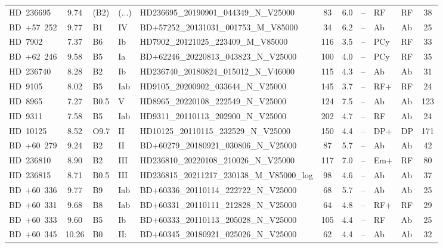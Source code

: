 {\begin{landscape}
\begin{longtable}{lclllcclllc}
\noalign{\smallskip}
HD~236695 & 9.74 & (B2) & (...) & HD236695\_20190901\_044349\_N\_V25000 & 83 & 6.0 & -- & RF & RF & 38 \\
\noalign{\smallskip}
BD~+57~252 & 9.77 & B1 & IV & BD+57252\_20131031\_001753\_M\_V85000 & 34 & 6.2 & -- & Ab & Ab & 25 \\
\noalign{\smallskip}
HD~7902 & 7.37 & B6 & Ib & HD7902\_20121025\_223409\_M\_V85000 & 116 & 3.5 & -- & PCy & RF & 33 \\
\noalign{\smallskip}
BD~+62~246 & 9.58 & B5 & Ia & BD+62246\_20220813\_043823\_N\_V25000 & 100 & 4.0 & -- & PCy & RF & 35 \\
\noalign{\smallskip}
HD~236740 & 8.28 & B2 & Ib & HD236740\_20180824\_015012\_N\_V46000 & 115 & 4.3 & -- & Ab & Ab & 31 \\
\noalign{\smallskip}
HD~9105 & 8.02 & B5 & Iab & HD9105\_20200902\_033644\_N\_V25000 & 145 & 3.7 & -- & RF+ & RF & 24 \\
\noalign{\smallskip}
HD~8965 & 7.27 & B0.5 & V & HD8965\_20220108\_222549\_N\_V25000 & 124 & 7.5 & -- & Ab & Ab & 123 \\
\noalign{\smallskip}
HD~9311 & 7.58 & B5 & Iab & HD9311\_20110113\_202900\_N\_V25000 & 202 & 4.7 & -- & RF & Ab & 24 \\
\noalign{\smallskip}
HD~10125 & 8.52 & O9.7 & II & HD10125\_20110115\_232529\_N\_V25000 & 150 & 4.4 & -- & DP+ & DP & 171 \\
\noalign{\smallskip}
BD~+60~279 & 9.24 & B2 & II & BD+60279\_20180921\_030806\_N\_V25000 & 87 & 5.7 & -- & Ab & Ab & 42 \\
\noalign{\smallskip}
HD~236810 & 8.90 & B2 & III & HD236810\_20220108\_210026\_N\_V25000 & 117 & 7.0 & -- & Em+ & RF & 80 \\
\noalign{\smallskip}
HD~236815 & 8.71 & B0.5 & III & HD236815\_20211217\_230138\_M\_V85000\_log & 98 & 4.6 & -- & Ab & Ab & 37 \\
\noalign{\smallskip}
BD~+60~336 & 9.77 & B9 & Iab & BD+60336\_20110114\_222722\_N\_V25000 & 68 & 5.7 & -- & Ab & Ab & 25 \\
\noalign{\smallskip}
BD~+60~331 & 9.68 & B8 & Iab & BD+60331\_20110111\_212828\_N\_V25000 & 64 & 4.8 & -- & RF+ & RF & 29 \\
\noalign{\smallskip}
BD~+60~333 & 9.60 & B5 & Ib & BD+60333\_20110113\_205028\_N\_V25000 & 105 & 4.4 & -- & RF & Ab & 25 \\
\noalign{\smallskip}
BD~+60~345 & 10.26 & B0 & II: & BD+60345\_20180921\_025026\_N\_V25000 & 62 & 4.4 & -- & Ab & Ab & 32 \\

\end{longtable}
\end{landscape}}

